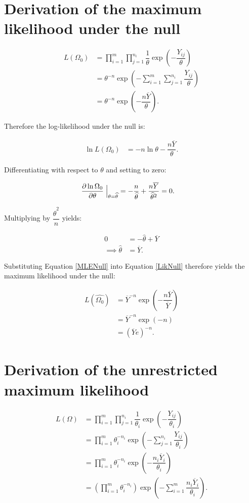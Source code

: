 \documentclass[12pt,a4paper]{article}
\newcommand{\eqn}[1]{Equation \ref{#1}}
\newcommand{\ovY}{\overline{Y}}
\newcommand{\wth}{\widehat{\theta}}
\begin{document}
    \section{Derivation of the maximum likelihood under the null}
    \begin{align}
        L(\Omega_0) &= \prod_{i=1}^m \prod_{j=1}^{n_i} \dfrac{1}{\theta} \exp\left(-\dfrac{Y_{ij}}{\theta}\right) \nonumber\\
        &= \theta^{-n} \exp\left(-\sum_{i=1}^m \sum_{j=1}^{n_i} \dfrac{Y_{ij}}{\theta}\right) \nonumber\\
        &= \theta^{-n} \exp\left(-\dfrac{n\ovY}{\theta}\right). \label{LikNull}
    \end{align}

    Therefore the log-likelihood under the null is:

    \begin{align*}
        \ln{L(\Omega_0)} &= -n\ln{\theta} - \dfrac{n\ovY}{\theta}.
    \end{align*}

    Differentiating with respect to $\theta$ and setting to zero:

    \begin{align*}
        \dfrac{\partial \ln{\Omega_0}}{\partial \theta} \Bigm \lvert_{\theta = \wth} &= -\dfrac{n}{\wth} + \dfrac{n\ovY}{\wth^2} = 0.
    \end{align*}

    Multiplying by $\dfrac{\wth^2}{n}$ yields:

    \begin{align}
        0 &= -\wth + \ovY \nonumber\\
        \implies \wth &= \ovY. \label{MLENull}
    \end{align}

    Substituting \eqn{MLENull} into \eqn{LikNull} therefore yields the maximum likelihood under the null:

    \begin{align}
        L(\widehat{\Omega_0}) &= \ovY^{-n} \exp\left(-\dfrac{n\ovY}{\ovY}\right) \nonumber\\
        &= \ovY^{-n} \exp(-n) \nonumber\\
        &= (\ovY e)^{-n}. \label{MLNull}
    \end{align}

    \section{Derivation of the unrestricted maximum likelihood}
    \begin{align}
        L(\Omega) &= \prod_{i=1}^m \prod_{j=1}^{n_i} \dfrac{1}{\theta_i} \exp\left(-\dfrac{Y_{ij}}{\theta_i}\right) \nonumber \\
        &= \prod_{i=1}^m \theta_i^{-n_i} \exp\left(-\sum_{j=1}^{n_i} \dfrac{Y_{ij}}{\theta_i}\right) \nonumber \\
        &= \prod_{i=1}^m \theta_i^{-n_i} \exp\left(-\dfrac{n_i\ovY_i}{\theta_i}\right) \nonumber \\
        &= \left(\prod_{i=1}^m \theta_i^{-n_i} \right)\exp\left(-\sum_{i=1}^m \dfrac{n_i\ovY_i}{\theta_i}\right).\label{LikUnr}
    \end{align}
\end{document}
